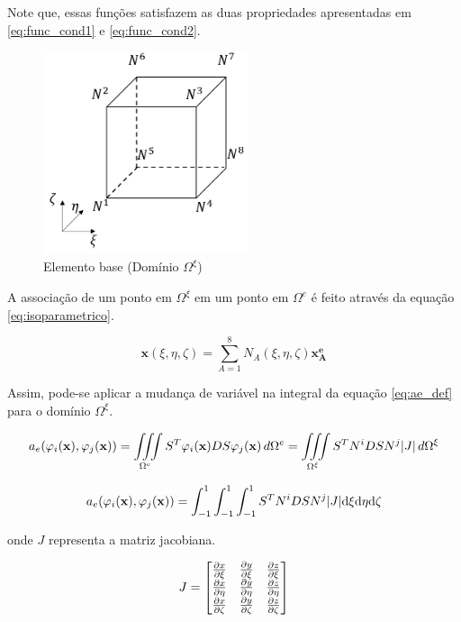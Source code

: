 Note que, essas funções satisfazem as duas propriedades apresentadas em \ref{eq:func_cond1} e \ref{eq:func_cond2}.


\begin{figure}[!htbp]
\label{fig:elemento_base}
\centering
\includegraphics[width=6cm]{chap01/elemento_base.png}
\caption{Elemento base (Domínio $\Omega^\xi$)}
\end{figure}



A associação de um ponto em $\Omega^\xi$ em um ponto em $\Omega^e$ é feito através da equação \ref{eq:isoparametrico}.


\begin{equation}
\label{eq:isoparametrico}
\mathbf{x}(\xi, \eta, \zeta) = \sum_{A=1}^{8} N_A(\xi, \eta, \zeta) \mathbf{x^e_A}
\end{equation}

Assim, pode-se aplicar a mudança de variável na integral da equação \ref{eq:ae_def} para o domínio $\Omega^\xi$.

\begin{equation}
 a_e(\phiix,\phijx) = \omeeint{S^T\phiix D S\phijx} = \omeint[\Omega^\xi]{S^T N^i D S N^j |J|}
\end{equation}


\begin{equation}
 a_e(\phiix,\phijx) = \int^1_ {-1}\int^1_ {-1}\int^1_ {-1}{S^T N^i D S N^j |J|} \text{d}\xi \text{d}\eta \text{d}\zeta
\end{equation}

onde $J$ representa a matriz jacobiana.

\begin{equation}
J = \begin{bmatrix}
\dxi[x]   &   \dxi[y] &   \dxi[z] \\
\deta[x]  &  \deta[y] &  \deta[z] \\
\dzeta[x] & \dzeta[y] & \dzeta[z]
\end{bmatrix}
\label{eq:jacobiano}
\end{equation}

